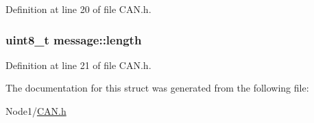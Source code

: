 Definition at line 20 of file C\+A\+N.\+h.

\subsubsection[{\texorpdfstring{length}{length}}]{\setlength{\rightskip}{0pt plus 5cm}uint8\+\_\+t message\+::length}\hypertarget{structmessage_a4990637e6cbd0a7afc3e57c1d6a74eeb}{}\label{structmessage_a4990637e6cbd0a7afc3e57c1d6a74eeb}


Definition at line 21 of file C\+A\+N.\+h.



The documentation for this struct was generated from the following file\+:\begin{DoxyCompactItemize}
\item 
Node1/\hyperlink{_node1_2_c_a_n_8h}{C\+A\+N.\+h}\end{DoxyCompactItemize}

